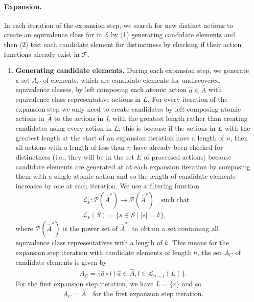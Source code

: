 \paragraph{Expansion.}
In each iteration of the expansion step, we search for new distinct actions to create an equivalence class for in $\mathcal{E}$ by (1) generating candidate elements and then (2) test each candidate element for distinctness by checking if their action functions already exist in $\mathcal{T}$.
\begin{enumerate}
    \item \textbf{Generating candidate elements.}
    During each expansion step, we generate a set $A_{C}$ of elements, which are candidate elements for undiscovered equivalence classes, by left composing each atomic action $\hat{a} \in \hat{A}$ with equivalence class representative actions in $L$.
    For every iteration of the expansion step we only need to create candidates by left composing atomic actions in $\hat{A}$ to the actions in $L$ with the greatest length rather than creating candidates using every action in $L$; this is because if the actions in $L$ with the greatest length at the start of an expansion iteration have a length of $n$, then all actions with a length of less than $n$ have already been checked for distinctness (i.e., they will be in the set $E$ of processed actions) because candidate elements are generated at at each expansion iteration by composing them with a single atomic action and so the length of candidate elements increases by one at each iteration.
    We use a filtering function
    \begin{align}
        & \mathcal{L}_{k}: \mathcal{P}(\hat{A}^{*}) \to \mathcal{P}(\hat{A}^{*}) \quad \text{such that} \\
        & \mathcal{L}_{k}(S) = \{ s \in S \mid |s| = k \},
    \end{align}
    where $\mathcal{P}(\hat{A}^{*})$ is the power set of $\hat{A}^{*}$, to obtain a set containing all equivalence class representatives with a length of $k$.
    This means for the expansion step iteration with candidate elements of length $n$, the set $A_{C}$ of candidate elements is given by
    \begin{align}
        A_{C} = \{ \hat{a} \circ l \mid \hat{a} \in \hat{A}, l \in  \mathcal{L}_{n-1}(L)\}.
    \end{align}
    For the first expansion step iteration, we have $L = \{\varepsilon\}$ and so
    \begin{equation}
        A_{C} = \hat{A} \quad \text{for the first expansion step iteration}.
    \end{equation}


\end{enumerate}
